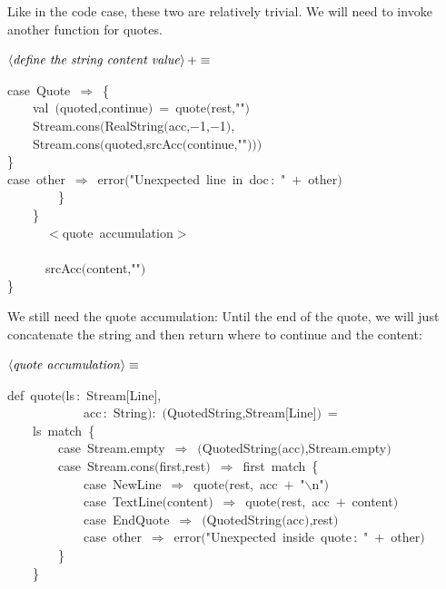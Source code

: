\documentclass[a4paper,12pt]{article}
\begin{document}
Like in the code case, these two are relatively trivial. We will need
to invoke another function for quotes.

$\left<\mbox{\emph{define the string content value}}\right>+\equiv$
\begin{program}{\vem case}~Quote~$\Rightarrow$~{\small\{}
\\~~~~{\vem val}~$($quoted,continue$)$~=~quote$($rest,""$)$
\\~~~~Stream.cons$($RealString$($acc,$-$1,$-$1$)$,
\\~~~~Stream.cons$($quoted,srcAcc$($continue,""$)$$)$$)$
\\{\small\}}
\\{\vem case}~other~$\Rightarrow$~error$($"Unexpected~line~in~doc\,{\rm :}~"~$+$~other$)$
\\~~~~~~~~{\small\}}
\\~~~~{\small\}}
\\[0.5em]~~~~~~$<$quote~accumulation$>$
\\~~~~~~~~
\\~~~~~~srcAcc$($content,""$)$
\\{\small\}}
\\[0.5em]\end{program}


We still need the quote accumulation: Until the end of the quote, we
will just concatenate the string and then return where to continue and
the content:

$\left<\mbox{\emph{quote accumulation}}\right>\equiv$
\begin{program}{\vem def}~quote$($ls\,{\rm :}~Stream$[$Line$]$,
\\~~~~~~~~~~~~acc\,{\rm :}~String$)${\rm :}~$($QuotedString,Stream$[$Line$]$$)$~=
\\~~~~ls~{\vem match}~{\small\{}
\\~~~~~~~~{\vem case}~Stream.empty~$\Rightarrow$~$($QuotedString$($acc$)$,Stream.empty$)$
\\~~~~~~~~{\vem case}~Stream.cons$($first,rest$)$~$\Rightarrow$~first~{\vem match}~{\small\{}
\\~~~~~~~~~~~~{\vem case}~NewLine~$\Rightarrow$~quote$($rest,~acc~$+$~"$\backslash$n"$)$
\\~~~~~~~~~~~~{\vem case}~TextLine$($content$)$~$\Rightarrow$~quote$($rest,~acc~$+$~content$)$
\\~~~~~~~~~~~~{\vem case}~EndQuote~$\Rightarrow$~$($QuotedString$($acc$)$,rest$)$
\\~~~~~~~~~~~~{\vem case}~other~$\Rightarrow$~error$($"Unexpected~inside~quote\,{\rm :}~"~$+$~other$)$
\\~~~~~~~~{\small\}}
\\~~~~{\small\}}
\\[0.5em]\end{program}
\end{document}
